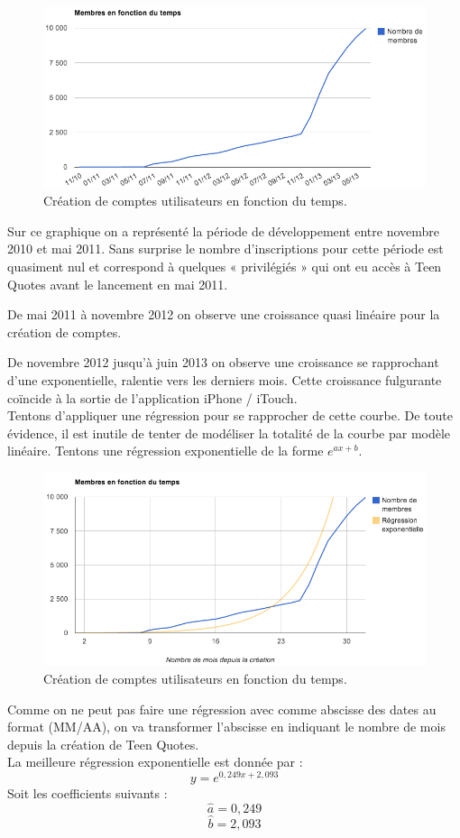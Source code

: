 \documentclass{report}
\begin{document}
	\begin{figure}[H]
		\center
		\includegraphics[width=450px]{images/membresTemps.png}
		\caption{Création de comptes utilisateurs en fonction du temps.}
	\end{figure}
	Sur ce graphique on a représenté la période de développement entre novembre 2010 et mai 2011. Sans surprise le nombre d'inscriptions pour cette période est quasiment nul et correspond à quelques « privilégiés » qui ont eu accès à Teen Quotes avant le lancement en mai 2011.

	De mai 2011 à novembre 2012 on observe une croissance quasi linéaire pour la création de comptes.

	De novembre 2012 jusqu'à juin 2013 on observe une croissance se rapprochant d'une exponentielle, ralentie vers les derniers mois. Cette croissance fulgurante coïncide à la sortie de l'application iPhone / iTouch.\\

	Tentons d'appliquer une régression pour se rapprocher de cette courbe. De toute évidence, il est inutile de tenter de modéliser la totalité de la courbe par modèle linéaire. Tentons une régression exponentielle de la forme $e^{ax + b}$.
	\begin{figure}[H]
		\center
		\includegraphics[width=450px]{images/membresRegression.png}
		\caption{Création de comptes utilisateurs en fonction du temps.}
	\end{figure}
	Comme on ne peut pas faire une régression avec comme abscisse des dates au format (MM/AA), on va transformer l'abscisse en indiquant le nombre de mois depuis la création de Teen Quotes.\\
	La meilleure régression exponentielle est donnée par :
	\[y = e^{0,249x + 2,093}\]
	Soit les coefficients suivants :
	\[\widehat{a} = 0,249\]
	\[\widehat{b} = 2,093\]
\end{document}
